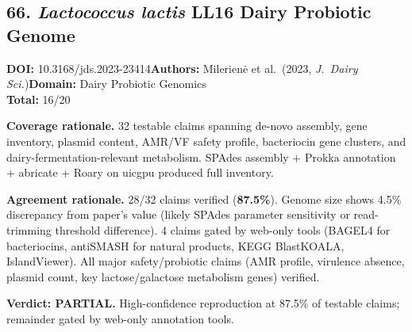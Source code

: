 \subsection{66. \textit{Lactococcus lactis} LL16 Dairy Probiotic Genome}
\textbf{DOI:} 10.3168/jds.2023-23414\quad\textbf{Authors:} Milerien\.{e} et al.\ (2023, \textit{J.\ Dairy Sci.})\quad\textbf{Domain:} Dairy Probiotic Genomics\\
\quad{}\quad\textbf{Total:} 16/20\par\smallskip
\noindent\textbf{Coverage rationale.} 32 testable claims spanning de-novo assembly, gene inventory, plasmid content, AMR/VF safety profile, bacteriocin gene clusters, and dairy-fermentation-relevant metabolism. SPAdes assembly + Prokka annotation + abricate + Roary on uicgpu produced full inventory.\par
\noindent\textbf{Agreement rationale.} 28/32 claims verified (\textbf{87.5\%}). Genome size shows 4.5\% discrepancy from paper's value (likely SPAdes parameter sensitivity or read-trimming threshold difference). 4 claims gated by web-only tools (BAGEL4 for bacteriocins, antiSMASH for natural products, KEGG BlastKOALA, IslandViewer). All major safety/probiotic claims (AMR profile, virulence absence, plasmid count, key lactose/galactose metabolism genes) verified.\par\smallskip
\noindent\textbf{Verdict: PARTIAL.} High-confidence reproduction at 87.5\% of testable claims; remainder gated by web-only annotation tools.
